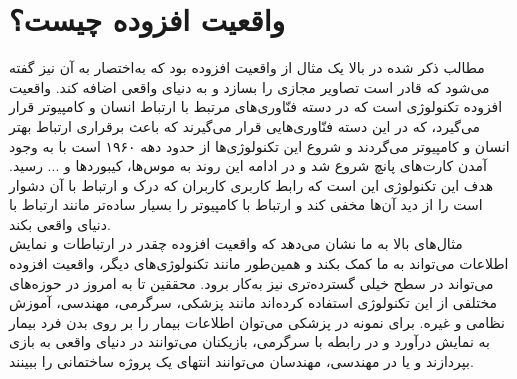 \section{واقعیت افزوده چیست؟}
مطالب ذکر شده در بالا ‌یک مثال از واقعیت افزوده بود  که به‌اختصار به آن  نیز گفته می‌شود که قادر است تصاویر مجازی را بسازد و به دنیای واقعی اضافه کند. واقعیت افزوده تکنولوژی است که در دسته فنّاوری‌های مرتبط با ارتباط انسان و کامپیوتر  قرار می‌گیرد، که در این دسته فنّاوری‌هایی قرار می‌گیرند که باعث برقراری ارتباط  بهتر انسان و کامپیوتر می‌گردند و شروع این تکنولوژی‌ها از حدود دهه ۱۹۶۰ است با به وجود آمدن کارت‌های پانچ شروع شد و در ادامه این روند به موس‌ها، کیبوردها و ... رسید. هدف این تکنولوژی این است که رابط کاربری  کاربران که درک و ارتباط با آن دشوار است را از دید آن‌ها مخفی کند و ارتباط با کامپیوتر را بسیار ساده‌تر مانند ارتباط با دنیای واقعی بکند.
\\
مثال‌های بالا به ما نشان می‌دهد که واقعیت افزوده چقدر در ارتباطات و نمایش اطلاعات می‌تواند به ما کمک بکند و همین‌طور مانند تکنولوژی‌های دیگر، واقعیت افزوده می‌تواند در سطح خیلی گسترده‌تری نیز به‌کار برود. محققین تا به امروز در حوزه‌های مختلفی از این تکنولوژی استفاده کرده‌اند مانند پزشکی، سرگرمی، مهندسی، آموزش نظامی و غیره. برای نمونه در پزشکی می‌توان اطلاعات بیمار را بر روی بدن فرد بیمار به نمایش درآورد \cite{nasir}و در رابطه با سرگرمی، بازیکنان می‌توانند در دنیای واقعی به بازی بپردازند \cite{Piekarski}و یا در مهندسی، مهندسان می‌توانند انتهای یک پروژه ساختمانی را ببینند\cite{Fjeld}.
\\


